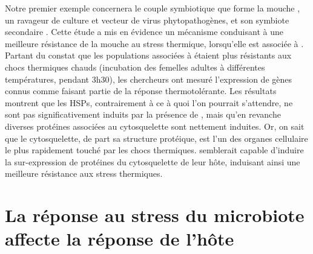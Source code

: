 Notre premier exemple concernera le couple symbiotique que forme la mouche , un ravageur de culture et vecteur de virus phytopathogènes, et son symbiote secondaire  \cite{brumin2011}.
Cette étude a mis en évidence un mécanisme conduisant à une meilleure résistance de la mouche au stress thermique, lorsqu'elle est associée à .
Partant du constat que les populations associées à  étaient plus résistants aux chocs thermiques chauds (incubation des femelles adultes à différentes températures, pendant 3h30), les chercheurs ont mesuré l'expression de gènes connus comme faisant partie de la réponse thermotolérante.
Les résultats montrent que les HSPs, contrairement à ce à quoi l'on pourrait s'attendre, ne sont pas significativement induits par la présence de , mais qu'en revanche diverses protéines associées au cytosquelette sont nettement induites.
Or, on sait que le cytosquelette, de part sa structure protéique, est l'un des organes cellulaire le plus rapidement touché par les chocs thermiques.
 semblerait capable d'induire la sur-expression de protéines du cytosquelette de leur hôte, induisant ainsi une meilleure résistance aux stress thermiques.


\section{La réponse au stress du microbiote affecte la réponse de l'hôte}



\cite{dunbar2007}
\cite{stoll2009}
\cite{harmon2009}
\cite{montllor2002}
\cite{bordenstein2011}
